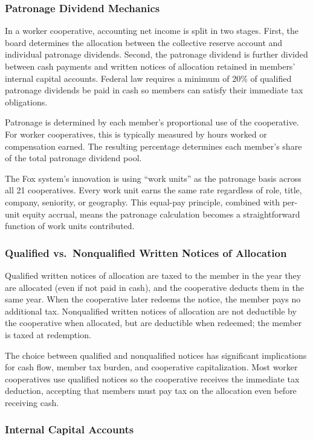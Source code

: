 \documentclass[11pt,letterpaper]{article}
\begin{document}
\subsubsection{Patronage Dividend Mechanics}

In a worker cooperative, accounting net income is split in two stages. First, the board determines the allocation between the collective reserve account and individual patronage dividends. Second, the patronage dividend is further divided between cash payments and written notices of allocation retained in members' internal capital accounts. Federal law requires a minimum of 20\% of qualified patronage dividends be paid in cash so members can satisfy their immediate tax obligations.

Patronage is determined by each member's proportional use of the cooperative. For worker cooperatives, this is typically measured by hours worked or compensation earned. The resulting percentage determines each member's share of the total patronage dividend pool.

The Fox system's innovation is using ``work units'' as the patronage basis across all 21 cooperatives. Every work unit earns the same rate regardless of role, title, company, seniority, or geography. This equal-pay principle, combined with per-unit equity accrual, means the patronage calculation becomes a straightforward function of work units contributed.

\subsubsection{Qualified vs.\ Nonqualified Written Notices of Allocation}

Qualified written notices of allocation are taxed to the member in the year they are allocated (even if not paid in cash), and the cooperative deducts them in the same year. When the cooperative later redeems the notice, the member pays no additional tax. Nonqualified written notices of allocation are not deductible by the cooperative when allocated, but are deductible when redeemed; the member is taxed at redemption.

The choice between qualified and nonqualified notices has significant implications for cash flow, member tax burden, and cooperative capitalization. Most worker cooperatives use qualified notices so the cooperative receives the immediate tax deduction, accepting that members must pay tax on the allocation even before receiving cash.

\subsubsection{Internal Capital Accounts}
\end{document}

